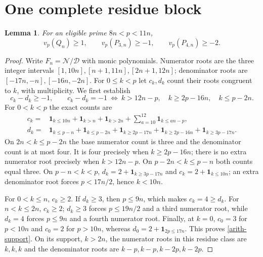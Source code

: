 \documentclass[11pt]{article}
\newcommand{\vp}{v_p}
\newtheorem{lemma}{Lemma}
\begin{document}
\section{One complete residue block}
\begin{lemma}\label{arith-block}
For an eligible prime $8n<p<11n$,
\[
 \vp(Q_n)\geq1,\qquad \vp(P_{3,n})\geq-1,\qquad
 \vp(P_{4,n})\geq-2.
\]
\end{lemma}
\begin{proof}
Write $F_n=\mathcal N/\mathcal D$ with monic polynomials. Numerator roots
are the three integer intervals $[1,10n],[n+1,11n],[2n+1,12n]$;
denominator roots are $[-17n,-n],[-16n,-2n]$.
For $0\leq k<p$ let $c_k,d_k$ count their roots congruent to $k$,
with multiplicity. We first establish
\begin{equation}\label{arith-support}
 c_k-d_k\geq-1,
 \qquad c_k-d_k=-1\ \Longleftrightarrow\
 k>12n-p,\quad k\geq2p-16n,\quad k\leq p-2n.
\end{equation}
For $0<k<p$ the exact counts are
\begin{align*}
 c_k={}&\mathbf1_{k\leq10n}+\mathbf1_{k>n}+\mathbf1_{k>2n}
       +\sum_{a=10}^{12}\mathbf1_{k\leq an-p},\\
 d_k={}&\mathbf1_{k\leq p-n}+\mathbf1_{k\leq p-2n}
       +\mathbf1_{k\geq2p-17n}+\mathbf1_{k\geq2p-16n}
       +\mathbf1_{k\geq3p-17n}.
\end{align*}
On $2n<k\leq p-2n$ the base numerator count is three and the denominator
count is at most four. It is four precisely when $k\geq2p-16n$;
there is no extra numerator root precisely when $k>12n-p$.
On $p-2n<k\leq p-n$ both counts equal three.
On $p-n<k<p$, $d_k=2+\mathbf1_{k\geq3p-17n}$ and
$c_k=2+\mathbf1_{k\leq10n}$; an extra denominator root forces
$p<17n/2$, hence $k<10n$.

For $0<k\leq n$, $c_k\geq2$. If $d_k\geq3$, then $p\leq9n$,
which makes $c_k=4\geq d_k$. For $n<k\leq2n$, $c_k\geq2$;
$d_k\geq3$ forces $p\leq19n/2$ and a third numerator root, while
$d_k=4$ forces $p\leq9n$ and a fourth numerator root.
Finally, at $k=0$, $c_0=3$ for $p<10n$ and $c_0=2$ for $p>10n$,
whereas $d_0=2+\mathbf1_{2p\leq17n}$. This proves \eqref{arith-support}.
On its support, $k>2n$, the numerator roots in this residue class are
$k,k,k$ and the denominator roots are $k-p,k-p,k-2p,k-2p$.


\end{proof}
\end{document}
